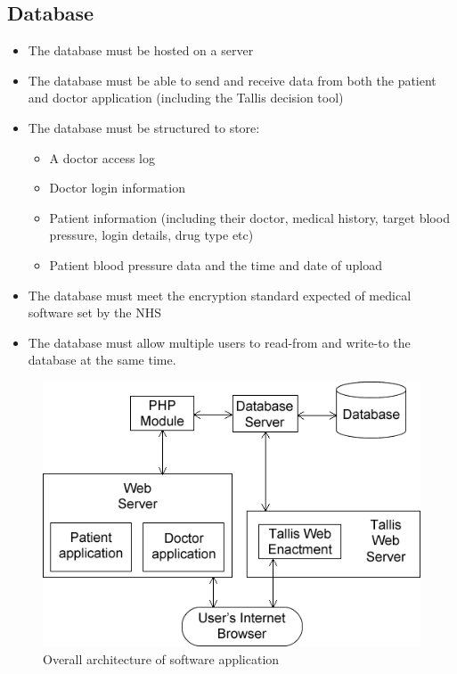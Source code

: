 \documentclass[11pt]{article}
\begin{document}
\subsection{Database}
\begin{itemize}
\item The database must be hosted on a server
\item The database must be able to send and receive data from both the patient and doctor application (including the Tallis decision tool)
\item The database must be structured to store:
	\begin{itemize}
	\item A doctor access log
    \item Doctor login information
    \item Patient information (including their doctor, medical history, target blood pressure, login details, drug type etc)
    \item Patient blood pressure data and the time and date of upload
	\end{itemize}
\item The database must meet the encryption standard expected of medical software set by the NHS \cite{encryption}
\item The database must allow multiple users to read-from and write-to the database at the same time. 
\end{itemize}

\begin{figure}[ht]
\begin{center}
\includegraphics[scale=0.5]{network}
\caption{Overall architecture of software application}
\label{fig:network}
\end{center}
\end{figure}
\end{document}

